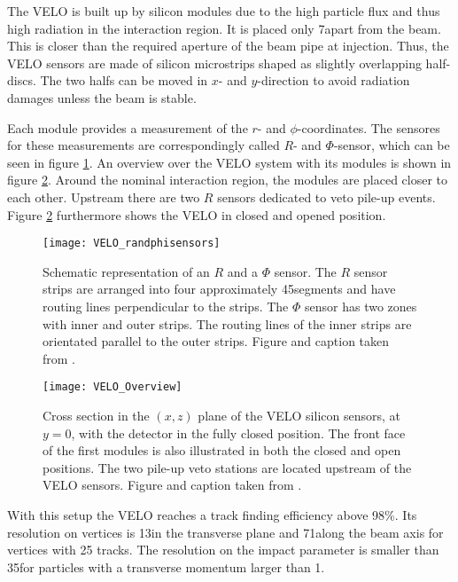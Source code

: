The VELO is built up by silicon modules due to the high particle flux and thus high radiation in the interaction region. It is placed only 7\mm apart from the beam. This is closer than the required aperture of the \lhcb beam pipe at injection. Thus, the VELO sensors are made of silicon microstrips shaped as slightly overlapping half-discs. The two halfs can be moved in $x$- and $y$-direction to avoid radiation damages unless the beam is stable.

Each module provides a measurement of the $r$- and $\phi$-coordinates.
The sensores for these measurements are correspondingly called $R$- and $\Phi$-sensor, which can be seen in figure \ref{fig:VELO_RandPhiSensor}.
An overview over the VELO system with its modules is shown in figure \ref{fig:VELO_Overview}. Around the nominal interaction region, the modules are placed closer to each other. Upstream there are two $R$ sensors dedicated to veto pile-up events. 
Figure \ref{fig:VELO_Overview} furthermore shows the VELO in closed and opened position.
\begin{figure}[hptb]
    \centering
	\texttt{[image: VELO\_randphisensors]}	
	\caption{Schematic representation of an $R$ and a $\Phi$ sensor. The $R$ sensor strips are arranged into four approximately 45\degrees segments and have routing lines perpendicular to the strips. The $\Phi$ sensor has two zones with inner and outer strips. The routing lines of the inner strips
    are orientated parallel to the outer strips. Figure and caption taken from \cite{VELO_Performance}.}
	\label{fig:VELO_RandPhiSensor}
\end{figure}
\begin{figure}[hptb]
    \centering
	\texttt{[image: VELO\_Overview]}	
	\caption{Cross section in the $(x,z)$ plane of the VELO silicon sensors, at $y=0$, with the detector in the fully closed position. 
             The front face of the first modules is also illustrated in both the closed and open positions. 
             The two pile-up veto stations are located upstream of the VELO sensors.
             Figure and caption taken from \cite{detector}.}
	\label{fig:VELO_Overview}
\end{figure}
With this setup the VELO reaches a track finding efficiency above 98\%. Its resolution on vertices is 13\mum in the transverse plane and 71\mum along the beam axis for vertices with 25 tracks. 
The resolution on the impact parameter is smaller than 35\mum for particles with a transverse momentum larger than 1\gev \cite{detector, VELO_TDR, VELO_Performance}.

